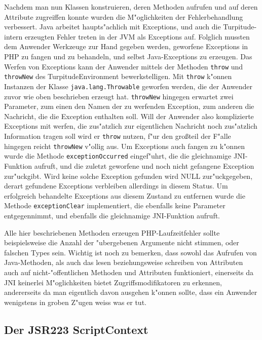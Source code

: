 Nachdem man nun Klassen konstruieren, deren Methoden aufrufen und auf deren Attribute zugreiffen konnte wurden die M"oglichkeiten der Fehlerbehandlung
verbessert. Java arbeitet haupts"achlich mit Exceptions, und auch die Turpitude-intern erzeugten Fehler treten in der JVM als Exceptions auf. Folglich mussten dem
Anwender Werkzeuge zur Hand gegeben werden, geworfene Exceptions in PHP zu fangen und zu behandeln, und selbst Java-Exceptions zu erzeugen. Das Werfen von
Exceptions kann der Anwender mittels der Methoden \texttt{throw} und \texttt{throwNew} des TurpitudeEnvironment bewerkstelligen. Mit \texttt{throw} k"onnen Instanzen
der Klasse \texttt{java.lang.Throwable} geworfen werden, die der Anwender zuvor wie oben beschrieben erzeugt hat. \texttt{throwNew} hingegen erwartet zwei Parameter,
zum einen den Namen der zu werfenden Exception, zum anderen die Nachricht, die die Exception enthalten soll. Will der Anwender also komplizierte Exceptions mit
werfen, die zus"atzlich zur eigentlichen Nachricht noch zus"atzlich Information tragen soll wird er \texttt{throw} nutzen, f"ur den gro\ss teil der F"alle 
hingegen reicht \texttt{throwNew} v"ollig aus. Um Exceptions auch fangen zu k"onnen wurde die Methode \texttt{exceptionOccurred} eingef"uhrt, die die gleichnamige
JNI-Funktion aufruft, und die zuletzt geworfene und noch nicht gefangene Exception zur"uckgibt. Wird keine solche Exception gefunden wird NULL zur"uckgegeben,
derart gefundene Exceptions verbleiben allerdings in diesem Status. Um erfolgreich behandelte Exceptions aus diesem Zustand zu entfernen wurde die Methode
\texttt{exceptionClear} implementiert, die ebenfalls keine Parameter entgegennimmt, und ebenfalls die gleichnamige JNI-Funktion aufruft.

Alle hier beschriebenen Methoden erzeugen PHP-Laufzeitfehler sollte beispielsweise die Anzahl der "ubergebenen Argumente nicht stimmen, oder falschen Types sein.
Wichtig ist noch zu bemerken, dass sowohl das Aufrufen von Java-Methoden, als auch das lesen beziehungsweise schreiben von Attributen auch auf nicht-"offentlichen
Methoden und Attributen funktioniert, einerseits da JNI keinerlei M"oglichkeiten bietet Zugriffsmodifikatoren zu erkennen, andererseits da man eigentlich davon
ausgehen k"onnen sollte, dass ein Anwender wenigstens in groben Z"ugen weiss was er tut. 

\subsection{Der JSR223 ScriptContext}
\label{sec:chap1:impl:9}


